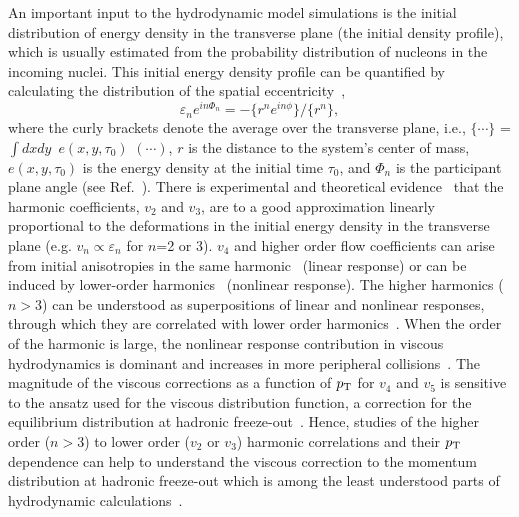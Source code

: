 An important input to the hydrodynamic model simulations is the initial distribution of energy density in the transverse plane (the initial density profile), which is usually estimated from the probability distribution of nucleons in the incoming nuclei.
This initial energy density profile can be quantified by calculating the distribution of the spatial eccentricity~\cite{Alver:2010gr},
\begin{equation}
 \varepsilon_{n} e^{in\Phi_{n}} = -\{r^n e^{in\phi}\}/ \{r^n\},
  \label{eq:eccentricities}
\end{equation}
where the curly brackets denote the average over the transverse plane, i.e., $\{\cdots\}$ = $\int dxdy$\, $e(x,y,\tau_0)$ $(\cdots)$, $r$ is the distance to the system's center of mass, $e(x,y,\tau_0)$ is the energy density at the initial time $\tau_0$, and $\Phi_{n}$ is the participant plane angle (see Ref.~\cite{Teaney:2010vd,Niemi:2015qia}).
There is experimental and theoretical evidence~\cite{Alver:2010gr,Qiu:2011iv,ALICE:2011ab} that the harmonic coefficients, $v_2$ and $v_3$, are to a good approximation linearly proportional to the deformations in the initial energy density in the transverse plane (e.g. $v_n \propto \varepsilon_n$ for $n$=2 or 3).
$v_4$ and higher order flow coefficients can arise from initial anisotropies in the same harmonic~\cite{Alver:2010gr,Teaney:2010vd,Gubser:2010ui,Hatta:2014jva} (linear response) or can be induced by lower-order harmonics~\cite{Bravina:2013xla,Bravina:2013ora} (nonlinear response).
The higher harmonics ($n>3$) can be understood as superpositions of linear and nonlinear responses, through which they are correlated with lower order harmonics~\cite{Teaney:2012ke,Bravina:2013ora,Gubser:2010ui,Hatta:2014jva}. When the order of the harmonic is large, the nonlinear response contribution in viscous hydrodynamics is dominant and increases in more peripheral collisions~\cite{Teaney:2012ke,Bravina:2013ora}.
The magnitude of the viscous corrections as a function of $p_{\rm T}$ for $v_4$ and $v_5$ is sensitive to the ansatz used for the viscous distribution function, a correction for the equilibrium distribution at hadronic freeze-out~\cite{Luzum:2010ad,Teaney:2012ke}.
Hence, studies of the higher order ($n>3$) to lower order ($v_2$ or $v_3$) harmonic correlations and their $p_{\rm T}$ dependence can help to understand the viscous correction to the momentum distribution at hadronic freeze-out which is among the least understood parts of hydrodynamic calculations~\cite{Dusling:2009df,Teaney:2012ke,Molnar:2014fva,Niemi:2015qia}.

